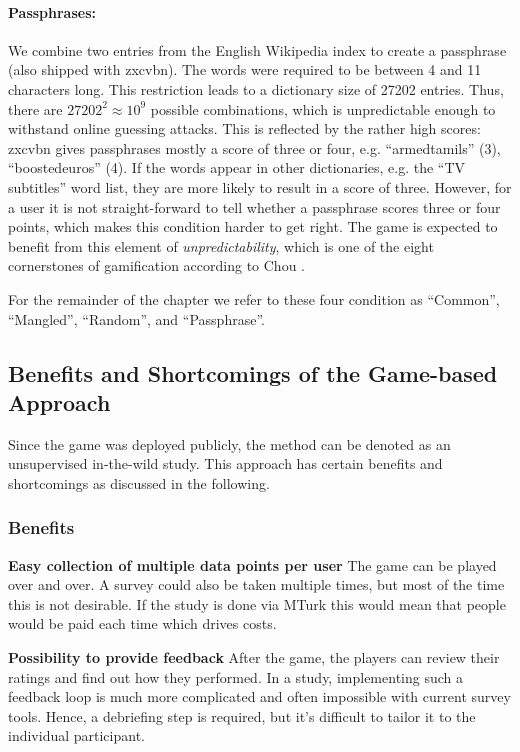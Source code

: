 \paragraph{Passphrases: } We combine two entries from the English Wikipedia index to create a passphrase (also shipped with zxcvbn). The words were required to be between 4 and 11 characters long. This restriction leads to a dictionary size of 27202 entries. Thus, there are $27202^2 \approx 10^9$ possible combinations, which is unpredictable enough to withstand online guessing attacks. This is reflected by the rather high scores: zxcvbn gives passphrases mostly a score of three or four, e.g. ``armedtamils'' (3), ``boostedeuros'' (4). If the words appear in other dictionaries, e.g. the ``TV subtitles'' word list, they are more likely to result in a score of three. However, for a user it is not straight-forward to tell whether a passphrase scores three or four points, which makes this condition harder to get right. The game is expected to benefit from this element of \textit{unpredictability}, which is one of the eight cornerstones of gamification according to Chou \cite{Chou2015Gamification}.

\vspace*{2ex}
For the remainder of the chapter we refer to these four condition as ``Common'', ``Mangled'', ``Random'', and ``Passphrase''.

\subsection{Benefits and Shortcomings of the Game-based Approach}\label{sec:pasdjo:beneftis_shortcomings_method}
Since the game was deployed publicly, the method can be denoted as an unsupervised in-the-wild study. This approach has certain benefits and shortcomings as discussed in the following. 

\subsubsection{Benefits}
\textbf{Easy collection of multiple data points per user} The game can be played over and over. A survey could also be taken multiple times, but most of the time this is not desirable. If the study is done via MTurk this would mean that people would be paid each time which drives costs.

\vspace*{1ex}
\noindent\textbf{Possibility to provide feedback} After the game, the players can review their ratings and find out how they performed. In a study, implementing such a feedback loop is much more complicated and often impossible with current survey tools. Hence, a debriefing step is required, but it's difficult to tailor it to the individual participant.

